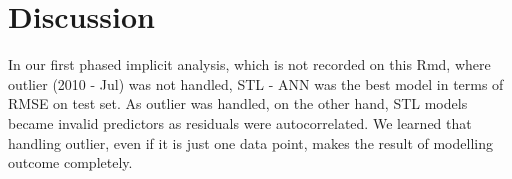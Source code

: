 \documentclass[openany]{book}
\begin{document}
\section*{Discussion}\label{b-discussion}

In our first phased implicit analysis, which is not recorded on this
Rmd, where outlier (2010 - Jul) was not handled, STL - ANN was the best
model in terms of RMSE on test set. As outlier was handled, on the other
hand, STL models became invalid predictors as residuals were
autocorrelated. We learned that handling outlier, even if it is just one
data point, makes the result of modelling outcome completely.
\end{document}
